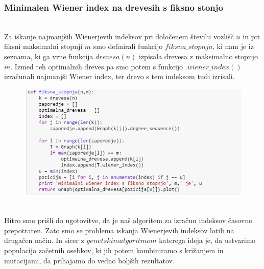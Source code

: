 \documentclass[12pt,a4paper]{amsart}
\theoremstyle{definition} %
\theoremstyle{plain} %
\begin{document}
\subsubsection{Minimalen Wiener index na drevesih s fiksno stonjo}
\
\\
Za iskanje najmanjših Wienerjevih indeksov pri določenem številu vozlišč $n$ in pri fiksni maksimalni stopnji  $m$
smo definirali funkcijo $fiksna\_stopnja$,  ki nam je iz seznama, ki ga vrne funkcija $drevesa(n)$ izpisala drevesa z maksimalno stopnjo $m$. Izmed teh optimalnih dreves pa smo potem s funkcijo $.wiener\_index()$ izračunali najmanjši Wiener index, ter drevo s tem indeksom tudi izrisali.

\begin{figure}[ht]
\centering
\includegraphics[width=1\textwidth]{slika2}
\end{figure}
\pagebreak
\
\\
Hitro smo prišli do ugotovitve, da je naš algoritem za izračun indeksov časovno prepotraten. Zato smo se problema iskanja Wienerjevih indeksov lotili na drugačen način. In sicer z $genetskim algoritmom$ katerega ideja je, da ustvarimo populacijo začetnih osebkov, ki jih potem kombiniramo s križanjem in mutacijami, da prihajamo do vedno boljših rezultatov.
\end{document}

